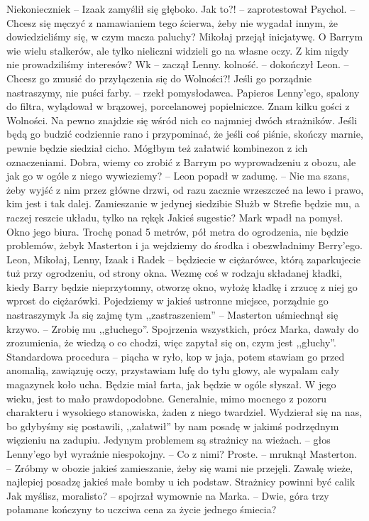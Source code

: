 \documentclass[../MAIN.tex]{subfiles}
\begin{document}
\xx Niekoniecznie\3k -- Izaak zamyślił się głęboko.
\xx Jak to?! -- zaprotestował Psychol. -- Chcesz się męczyć z namawianiem tego ścierwa, żeby nie wygadał innym, że dowiedzieliśmy się, w czym macza paluchy?
\qd
Mikołaj przejął inicjatywę.
\sx O Barrym wie wielu stalkerów, ale tylko nieliczni widzieli go na własne oczy. Z kim nigdy nie prowadziliśmy interesów?
\xx W\3k -- zaczął Lenny.
\xx \3kolność. -- dokończył Leon. -- Chcesz go zmusić do przyłączenia się do Wolności?!
\xx Jeśli go porządnie nastraszymy, nie puści farby. -- rzekł pomysłodawca.
\qd
Papieros Lenny’ego, spalony do filtra, wylądował w brązowej, porcelanowej popielniczce.
\sx Znam kilku gości z Wolności. Na pewno znajdzie się wśród nich co najmniej dwóch strażników. Jeśli będą go budzić codziennie rano i przypominać, że jeśli coś piśnie, skończy marnie, pewnie będzie siedział cicho. Mógłbym też załatwić kombinezon z ich oznaczeniami.
\xx Dobra, wiemy co zrobić z Barrym po wyprowadzeniu z obozu, ale jak go w ogóle z niego wywieziemy? -- Leon popadł w zadumę. -- Nie ma szans, żeby wyjść z nim przez główne drzwi, od razu zacznie wrzeszczeć na lewo i prawo, kim jest i tak dalej. Zamieszanie w jedynej siedzibie Służb w Strefie będzie mu, a raczej reszcie układu, tylko na rękę\3k Jakieś sugestie?
Mark wpadł na pomysł.
\xx Okno jego biura. Trochę ponad 5 metrów, pół metra do ogrodzenia, nie będzie problemów, żeby\3k Masterton i ja wejdziemy do środka i obezwładnimy Berry’ego. Leon, Mikołaj, Lenny, Izaak i Radek -- będziecie w ciężarówce, którą zaparkujecie tuż przy ogrodzeniu, od strony okna. Wezmę coś w rodzaju składanej kładki, kiedy Barry będzie nieprzytomny, otworzę okno, wyłożę kładkę i zrzucę z niej go wprost do ciężarówki.
Pojedziemy w jakieś ustronne miejsce, porządnie go nastraszymy\3k
\xx Ja się zajmę tym ,,zastraszeniem'' -- Masterton uśmiechnął się krzywo. -- Zrobię mu ,,głuchego''. \qd
Spojrzenia wszystkich, prócz Marka, dawały do zrozumienia, że wiedzą o co chodzi, więc zapytał się on, czym jest ,,głuchy''.
\sx Standardowa procedura -- piącha w ryło, kop w jaja, potem stawiam go przed anomalią, zawiązuję oczy, przystawiam lufę do tyłu głowy, ale wypalam cały magazynek koło ucha. Będzie miał farta, jak będzie w ogóle słyszał. W jego wieku, jest to mało prawdopodobne. Generalnie, mimo mocnego z pozoru charakteru i wysokiego stanowiska, żaden z niego twardziel. Wydzierał się na nas, bo gdybyśmy się postawili, ,,załatwił'' by nam posadę w jakimś podrzędnym więzieniu na zadupiu.
\xx Jedynym problemem są strażnicy na wieżach. -- głos Lenny’ego był wyraźnie niespokojny. -- Co z nimi?
\xx Proste. -- mruknął Masterton. -- Zróbmy w obozie jakieś zamieszanie, żeby się wami nie przejęli. Zawalę wieże, najlepiej posadzę jakieś małe bomby u ich podstaw. Strażnicy powinni być cali\3k Jak myślisz, moralisto? -- spojrzał wymownie na Marka. -- Dwie, góra trzy połamane kończyny to uczciwa cena za życie jednego śmiecia?
\end{document}
